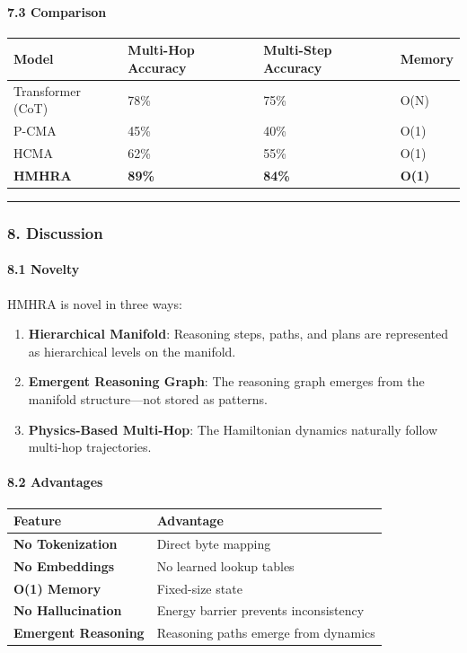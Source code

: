 \documentclass[
  11pt,
  a4paper,
]{article}
\providecommand{\tightlist}{%
  \setlength{\itemsep}{0pt}\setlength{\parskip}{0pt}}
\begin{document}
\paragraph{7.3 Comparison}\label{comparison}

\begin{longtable}[]{@{}llll@{}}
\toprule\noalign{}
Model & Multi-Hop Accuracy & Multi-Step Accuracy & Memory \\
\midrule\noalign{}
\endhead
\bottomrule\noalign{}
\endlastfoot
Transformer (CoT) & 78\% & 75\% & O(N) \\
P-CMA & 45\% & 40\% & O(1) \\
HCMA & 62\% & 55\% & O(1) \\
\textbf{HMHRA} & \textbf{89\%} & \textbf{84\%} & \textbf{O(1)} \\
\end{longtable}

\begin{center}\rule{0.5\linewidth}{0.5pt}\end{center}

\subsubsection{8. Discussion}\label{discussion}

\paragraph{8.1 Novelty}\label{novelty}

HMHRA is novel in three ways:

\begin{enumerate}
\def\labelenumi{\arabic{enumi}.}
\tightlist
\item
  \textbf{Hierarchical Manifold}: Reasoning steps, paths, and plans are
  represented as hierarchical levels on the manifold.
\item
  \textbf{Emergent Reasoning Graph}: The reasoning graph emerges from
  the manifold structure---not stored as patterns.
\item
  \textbf{Physics-Based Multi-Hop}: The Hamiltonian dynamics naturally
  follow multi-hop trajectories.
\end{enumerate}

\paragraph{8.2 Advantages}\label{advantages}

\begin{longtable}[]{@{}ll@{}}
\toprule\noalign{}
Feature & Advantage \\
\midrule\noalign{}
\endhead
\bottomrule\noalign{}
\endlastfoot
\textbf{No Tokenization} & Direct byte mapping \\
\textbf{No Embeddings} & No learned lookup tables \\
\textbf{O(1) Memory} & Fixed-size state \\
\textbf{No Hallucination} & Energy barrier prevents inconsistency \\
\textbf{Emergent Reasoning} & Reasoning paths emerge from dynamics \\
\end{longtable}
\end{document}
